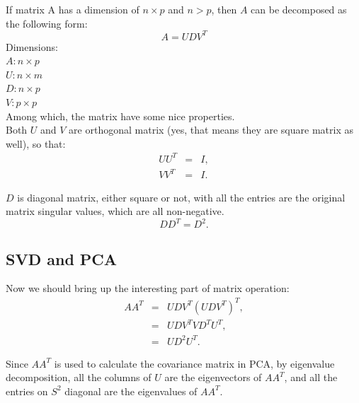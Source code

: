 \documentclass[a4paper]{article}
\begin{document}
If matrix A has a dimension of $ n \times p $  and  $ n>p $, then $A$ can be decomposed as the following form:\\

\begin{equation}
A = UDV^{T}
\end{equation}
Dimensions:\\
$A:  n\times p$ \\
$U:  n\times m$ \\
$D:  n\times p$ \\
$V:  p\times p$ \\

\noindent Among which, the matrix have some nice properties.\\

\noindent Both $U$ and $V$ are orthogonal matrix (yes, that means they are square matrix as well), so that:
\newline
\\
\begin{eqnarray}
UU^{T} &=& I, \\
VV^{T} &=& I. 
\end{eqnarray}

$D$ is diagonal matrix, either square or not, with all the entries are the original matrix singular values, which are all non-negative. \\
\begin{equation}
DD^{T} = D^{2}.
\end{equation}

\subsection{SVD and PCA}

Now we should bring up the interesting part of matrix operation: \\
\begin{eqnarray}
\nonumber AA^{T} &=&  UDV^{T}(UDV^{T})^{T}, \\
\nonumber & = & UDV^{T}VD^{T}U^{T},  \\
 & = & UD^{2}U^{T}.
\end{eqnarray}

Since $ AA^{T} $ is used to calculate the covariance matrix in PCA, by eigenvalue decomposition, all the columns of $U$ are the eigenvectors of $AA^{T}$, and all the entries on $ S^{2} $ diagonal are the eigenvalues of $AA^{T}$. \\
\end{document}
